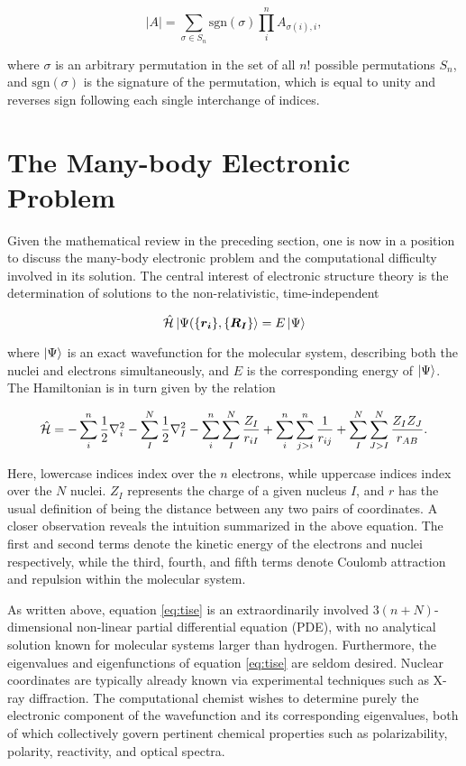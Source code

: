 \begin{equation}
	|A| = \sum_{\sigma \in S_n} \text{sgn}(\sigma) \prod^n_i A_{\sigma(i), i},
\end{equation}

\noindent where $\sigma$ is an arbitrary permutation in the set of all $n!$
possible permutations $S_n$, and $\text{sgn}(\sigma)$ is the signature of the
permutation, which is equal to unity and reverses sign following each single
interchange of indices.

\section{The Many-body Electronic Problem}
\label{s:problem}

Given the mathematical review in the preceding section, one is now in a position
to discuss the many-body electronic problem and the computational difficulty
involved in its solution. The central interest of electronic structure theory is
the determination of solutions to the non-relativistic, time-independent \SE

\begin{equation}
	\hat{\mathcal{H}} \ket{\Psi(\{\bm{r_i}\} , \{\bm{R_I}\}} = E \ket\Psi
\label{eq:tise}
\end{equation}

\noindent where $\ket\Psi$ is an exact wavefunction for the molecular system,
describing both the nuclei and electrons simultaneously, and $E$ is the
corresponding energy of $\ket\Psi$. The Hamiltonian is in turn given by the
relation

\begin{equation}
	\hat{\mathcal{H}} = - \sum_i^n \frac{1}{2}\nabla_i^2
	- \sum_I^N \frac{1}{2}\nabla_I^2
	 - \sum_i^n \sum_I^N \frac{Z_I}{r_{iI}}
	 + \sum_i^n \sum_{j > i}^n \frac{1}{r_{ij}}
	 + \sum_I^N \sum_{J > I}^N \frac{Z_I Z_J}{r_{AB}}.
\label{eq:fullh}
\end{equation}

Here, lowercase indices index over the $n$ electrons, while uppercase indices
index over the $N$ nuclei. $Z_I$ represents the charge of a given nucleus $I$,
and $r$ has the usual definition of being the distance between any two pairs of
coordinates. A closer observation reveals the intuition summarized in the above
equation. The first and second terms denote the kinetic energy of the electrons
and nuclei respectively, while the third, fourth, and fifth terms denote Coulomb
attraction and repulsion within the molecular system.

As written above, equation \ref{eq:tise} is an extraordinarily involved $3(n +
N)$-dimensional non-linear partial differential equation (PDE), with no
analytical solution known for molecular systems larger than hydrogen.
Furthermore, the eigenvalues and eigenfunctions of equation \ref{eq:tise} are
seldom desired. Nuclear coordinates are typically already known via experimental
techniques such as X-ray diffraction. The computational chemist wishes to
determine purely the electronic component of the wavefunction and its
corresponding eigenvalues, both of which collectively govern pertinent chemical
properties such as polarizability, polarity, reactivity, and optical spectra.

